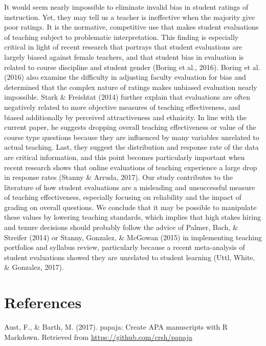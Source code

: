 \documentclass[man]{apa6}
\theoremstyle{definition}
\theoremstyle{definition}
\theoremstyle{definition}
\theoremstyle{remark}
\begin{document}
It would seem nearly impossible to eliminate invalid bias in student
ratings of instruction. Yet, they may tell us a teacher is ineffective
when the majority give poor ratings. It is the normative, competitive
use that makes student evaluations of teaching subject to problematic
interpretation. This finding is especially critical in light of recent
research that portrays that student evaluations are largely biased
against female teachers, and that student bias in evaluation is related
to course discipline and student gender (Boring et al., 2016). Boring et
al. (2016) also examine the difficulty in adjusting faculty evaluation
for bias and determined that the complex nature of ratings makes
unbiased evaluation nearly impossible. Stark \& Freishtat (2014) further
explain that evaluations are often negatively related to more objective
measures of teaching effectiveness, and biased additionally by perceived
attractiveness and ethnicity. In line with the current paper, he
suggests dropping overall teaching effectiveness or value of the course
type questions because they are influenced by many variables unrelated
to actual teaching. Last, they suggest the distribution and response
rate of the data are critical information, and this point becomes
particularly important when recent research shows that online
evaluations of teaching experience a large drop in response rates
(Stanny \& Arruda, 2017). Our study contributes to the literature of how
student evaluations are a misleading and unsuccessful measure of
teaching effectiveness, especially focusing on reliability and the
impact of grading on overall questions. We conclude that it may be
possible to manipulate these values by lowering teaching standards,
which implies that high stakes hiring and tenure decisions should
probably follow the advice of Palmer, Bach, \& Streifer (2014) or
Stanny, Gonzalez, \& McGowan (2015) in implementing teaching portfolios
and syllabus review, particularly because a recent meta-analysis of
student evaluations showed they are unrelated to student learning (Uttl,
White, \& Gonzalez, 2017).

\newpage

\section{References}\label{references}

\setlength{\parindent}{-0.5in} \setlength{\leftskip}{0.5in}

\hypertarget{refs}{}
\hypertarget{ref-Aust2017}{}
Aust, F., \& Barth, M. (2017). papaja: Create APA manuscripts with R
Markdown. Retrieved from \url{https://github.com/crsh/papaja}
\end{document}
